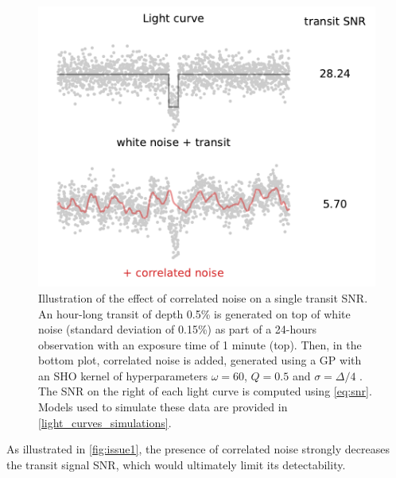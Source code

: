 \documentclass[modern]{aastex631}
\begin{document}
\begin{figure}[H]
    \begin{centering}
        \includegraphics[width=0.6\linewidth]{../workflows/plot_issues/figures/issue1.pdf}
        \caption{Illustration of the effect of correlated noise on a single transit SNR. An hour-long transit of depth 0.5\% is generated on top of white noise (standard deviation of 0.15\%) as part of a 24-hours observation with an exposure time of 1 minute (top). Then, in the bottom plot, correlated noise is added, generated using a GP with an SHO kernel of hyperparameters $\omega=60$, $Q=0.5$ and $\sigma=\Delta/4$ . The SNR on the right of each light curve is computed using \autoref{eq:snr}. Models used to simulate these data are provided in \autoref{light_curves_simulations}.}
        \label{fig:issue1}
    \end{centering}
\end{figure}

As illustrated in \autoref{fig:issue1}, the presence of correlated noise strongly decreases the transit signal SNR, which would ultimately limit its detectability.
\end{document}
